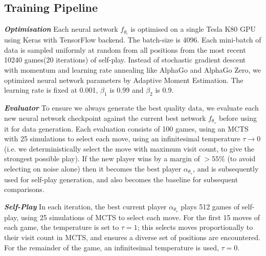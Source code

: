 \documentclass[12pt,a4paper]{article}
\begin{document}
\subsection{Training Pipeline}
\hspace{0.6cm}\textit{\textbf{Optimisation}} Each neural network \(f_{\theta_i}\) is optimised on a single Tesla K80 GPU using Keras with TensorFlow backend. The batch-size is 4096. Each mini-batch of data is sampled uniformly at random from all positions from the most recent 10240 games(20 iterations) of self-play. Instead of stochastic gradient descent with momentum and learning rate annealing like AlphaGo and AlphaGo Zero, we optimized neural network parameters by Adaptive Moment Estimation\cite{Adam}. The learning rate is fixed at 0.001, \(\beta_1\) is 0.99 and \(\beta_2\) is 0.9.\par
\textit{\textbf{Evaluator}} To ensure we always generate the best quality data, we evaluate each new neural network checkpoint against the current best network \(f_{\theta_∗}\) before using it for data generation. Each evaluation consists of 100 games, using an MCTS with 25 simulations to select each move, using an infinitesimal temperature \(\tau \to 0\) (i.e. we deterministically select the move with maximum visit count, to give the strongest possible play). If the new player wins by a margin of \(> 55\%\) (to avoid selecting on noise alone) then it becomes the best player \(\alpha_{\theta_∗}\), and is subsequently used for self-play generation, and also becomes the baseline for subsequent comparisons.\par
\textit{\textbf{Self-Play}} In each iteration, the best current player \(\alpha_{\theta_∗}\) plays 512 games of self-play, using 25 simulations of MCTS to select each move. For the first 15 moves of each game, the temperature is set to \(\tau = 1\); this selects moves proportionally to their visit count in MCTS, and ensures a diverse set of positions are encountered. For the remainder of the game, an infinitesimal temperature is used, \(\tau = 0\).\par
\end{document}
